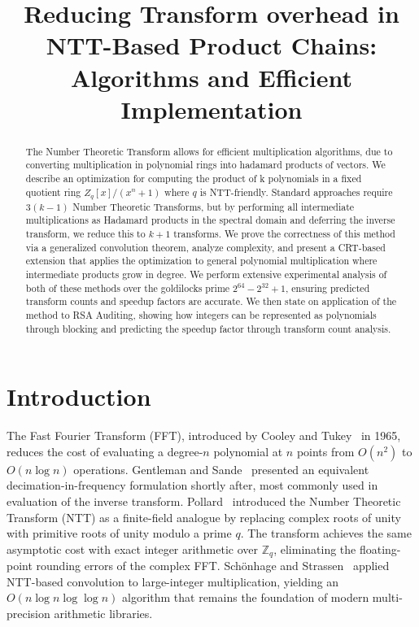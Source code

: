 \documentclass[runningheads]{llncs}
\title{Reducing Transform overhead in NTT-Based Product Chains: Algorithms and Efficient Implementation}
\begin{document}
\pagestyle{plain}

\maketitle

\begin{abstract}
The Number Theoretic Transform allows for efficient multiplication algorithms, due to converting multiplication in polynomial rings into hadamard products of vectors. We describe an optimization for computing the product of k polynomials in a fixed quotient ring $Z_{q}[x]/(x^n+1)$ where $q$ is NTT-friendly. Standard approaches require $3(k-1)$ Number Theoretic Transforms, but by performing all intermediate multiplications as Hadamard products in the spectral domain and deferring the inverse transform, we reduce this to $k+1$ transforms. We prove the correctness of this method via a generalized convolution theorem, analyze complexity, and present a CRT-based extension that applies the optimization to general polynomial multiplication where intermediate products grow in degree. We perform extensive experimental analysis of both of these methods over the goldilocks prime $2^{64}-2^{32}+1$, ensuring predicted transform counts and speedup factors are accurate. We then state on application of the  method to RSA Auditing, showing how integers can be represented as polynomials through blocking and predicting the speedup factor through transform count analysis.

\end{abstract}


\section{Introduction}

The Fast Fourier Transform (FFT), introduced by Cooley and Tukey~\cite{cooley1965algorithm} in 1965, reduces the cost of evaluating a degree-$n$ polynomial at $n$ points from $O(n^2)$ to $O(n \log n)$ operations. Gentleman and Sande~\cite{gentleman1966fft} presented an equivalent decimation-in-frequency formulation shortly after, most commonly used in evaluation of the inverse transform. Pollard~\cite{pollard1971fft} introduced the Number Theoretic Transform (NTT) as a finite-field analogue by replacing complex roots of unity with primitive roots of unity modulo a prime $q$. The transform achieves the same asymptotic cost with exact integer arithmetic over $\mathbb{Z}_q$, eliminating the floating-point rounding errors of the complex FFT. Schönhage and Strassen~\cite{schonhage1971} applied NTT-based convolution to large-integer multiplication, yielding an $O(n \log n \log \log n)$ algorithm that remains the foundation of modern multi-precision arithmetic libraries.
\end{document}
